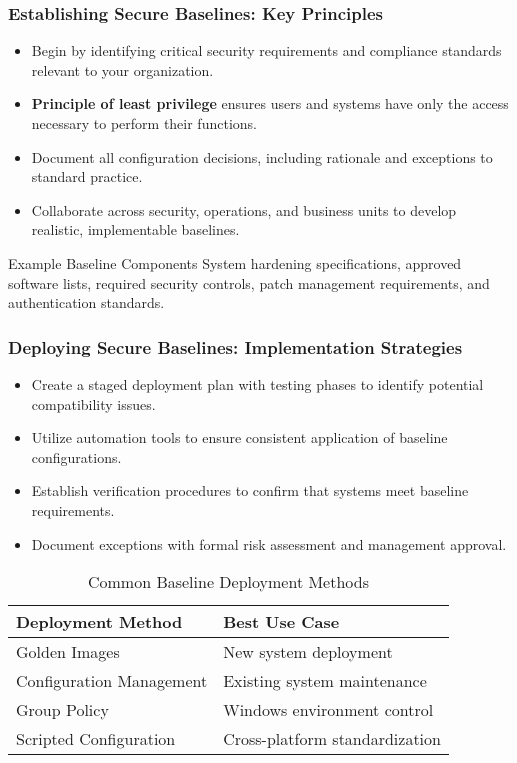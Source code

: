 \documentclass{beamer}
\begin{document}
\begin{frame}
    \frametitle{Establishing Secure Baselines: Key Principles}
    
    \begin{itemize}
        \item Begin by identifying critical security requirements and compliance standards relevant to your organization.
        \item \textbf{Principle of least privilege} ensures users and systems have only the access necessary to perform their functions.
        \item Document all configuration decisions, including rationale and exceptions to standard practice.
        \item Collaborate across security, operations, and business units to develop realistic, implementable baselines.
    \end{itemize}
    
    \begin{exampleblock}{Example Baseline Components}
        System hardening specifications, approved software lists, required security controls, patch management requirements, and authentication standards.
    \end{exampleblock}
\end{frame}

\begin{frame}
    \frametitle{Deploying Secure Baselines: Implementation Strategies}
    
    \begin{itemize}
        \item Create a staged deployment plan with testing phases to identify potential compatibility issues.
        \item Utilize automation tools to ensure consistent application of baseline configurations.
        \item Establish verification procedures to confirm that systems meet baseline requirements.
        \item Document exceptions with formal risk assessment and management approval.
    \end{itemize}
    
    \begin{table}
        \begin{tabular}{|l|l|}
            \hline
            \textbf{Deployment Method} & \textbf{Best Use Case} \\
            \hline
            Golden Images & New system deployment \\
            Configuration Management & Existing system maintenance \\
            Group Policy & Windows environment control \\
            Scripted Configuration & Cross-platform standardization \\
            \hline
        \end{tabular}
        \caption{Common Baseline Deployment Methods}
    \end{table}
\end{frame}
\end{document}
